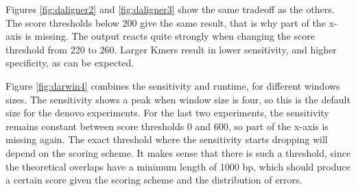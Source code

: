\documentclass[../main/thesis.tex]{subfiles}
\begin{document}
Figures \ref{fig:daligner2} and \ref{fig:daligner3} show the same tradeoff as the others.
The score thresholds below 200 give the same result, that is why part of the x-axis is missing.
The output reacts quite strongly when changing the score threshold from 220 to 260.
Larger Kmers result in lower sensitivity, and higher specificity, as can be expected.


Figure \ref{fig:darwin4} combines the sensitivity and runtime, for different windows sizes.
The sensitivity shows a peak when window size is four, so this is the default size for the denovo experiments.
For the last two experiments, the sensitivity remains constant between score thresholds 0 and 600, so part of the x-axis is missing again.
The exact threshold where the sensitivity starts dropping will depend on the scoring scheme.
It makes sense that there is such a threshold, since the theoretical overlaps have a minimum length of 1000 bp, which should produce a certain score given the scoring scheme and the distribution of errors.
\end{document}
